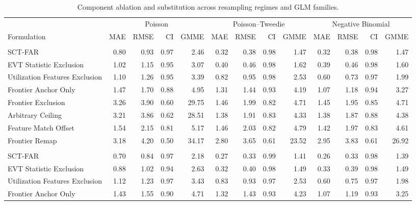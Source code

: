 \documentclass{article}
\begin{document}
\clearpage
\begin{table}[H]
\centering
\footnotesize
\captionsetup{position=top,skip=12pt}
\caption{Component ablation and substitution across resampling regimes and GLM families.}
\label{tab:si-ablation-complete}
\setlength{\tabcolsep}{2pt}
\begin{tabularx}{\linewidth}{@{}>{\raggedright\arraybackslash}Xrrrrrrrrrrrr@{}}
\toprule
 & \multicolumn{4}{c}{Poisson} & \multicolumn{4}{c}{Poisson--Tweedie} & \multicolumn{4}{c}{Negative Binomial} \\
\cmidrule(lr){2-5}\cmidrule(lr){6-9}\cmidrule(l){10-13}
Formulation & MAE & RMSE & CI & GMME & MAE & RMSE & CI & GMME & MAE & RMSE & CI & GMME \\
\midrule
\multicolumn{13}{@{}l}{\textbf{Domain (LOGO-CV)}} \\
SCT-FAR & 0.80 & 0.93 & 0.97 & 2.46 & 0.32 & 0.38 & 0.98 & 1.47 & 0.32 & 0.38 & 0.98 & 1.47 \\
EVT Statistic Exclusion & 1.02 & 1.15 & 0.95 & 3.07 & 0.40 & 0.46 & 0.98 & 1.62 & 0.39 & 0.46 & 0.98 & 1.60 \\
Utilization Features Exclusion & 1.10 & 1.26 & 0.95 & 3.39 & 0.82 & 0.95 & 0.98 & 2.53 & 0.60 & 0.73 & 0.97 & 1.99 \\
Frontier Anchor Only & 1.47 & 1.70 & 0.88 & 4.95 & 1.31 & 1.44 & 0.93 & 4.19 & 1.07 & 1.18 & 0.94 & 3.27 \\
Frontier Exclusion & 3.26 & 3.90 & 0.60 & 29.75 & 1.46 & 1.99 & 0.82 & 4.71 & 1.45 & 1.95 & 0.85 & 4.71 \\
Arbitrary Ceiling & 3.21 & 3.86 & 0.62 & 28.51 & 1.38 & 1.91 & 0.83 & 4.33 & 1.38 & 1.87 & 0.88 & 4.38 \\
Feature Match Offset & 1.54 & 2.15 & 0.81 & 5.17 & 1.46 & 2.03 & 0.82 & 4.79 & 1.42 & 1.97 & 0.83 & 4.61 \\
Frontier Remap & 3.18 & 4.20 & 0.50 & 34.17 & 2.80 & 3.65 & 0.61 & 23.52 & 2.95 & 3.83 & 0.61 & 26.92 \\
\addlinespace
\multicolumn{13}{@{}l}{\textbf{Discipline (LOGO-CV)}} \\
SCT-FAR & 0.70 & 0.84 & 0.97 & 2.18 & 0.27 & 0.33 & 0.99 & 1.41 & 0.26 & 0.33 & 0.98 & 1.39 \\
EVT Statistic Exclusion & 0.88 & 1.02 & 0.94 & 2.63 & 0.32 & 0.40 & 0.98 & 1.49 & 0.33 & 0.39 & 0.98 & 1.49 \\
Utilization Features Exclusion & 1.12 & 1.23 & 0.97 & 3.43 & 0.83 & 0.93 & 0.97 & 2.53 & 0.60 & 0.75 & 0.97 & 1.98 \\
Frontier Anchor Only & 1.43 & 1.55 & 0.90 & 4.71 & 1.32 & 1.43 & 0.93 & 4.23 & 1.07 & 1.19 & 0.93 & 3.25 \\

\end{tabularx}
\end{table}
\end{document}
